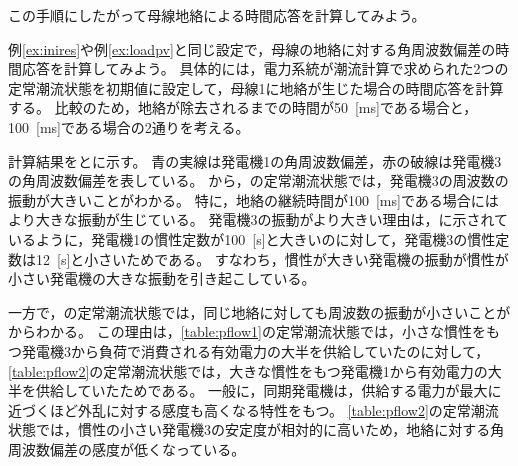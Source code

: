 \documentclass[tombow,dvipdfmx]{corona-a5-1.1}
\begin{document}
この手順にしたがって母線地絡による時間応答を計算してみよう。

\begin{例}[母線地絡に対する電力系統モデルの時間応答]\label{ex:busflt}
例\ref{ex:inires}や例\ref{ex:loadpv}と同じ設定で，母線の地絡に対する角周波数偏差の時間応答を計算してみよう。
具体的には，電力系統が潮流計算で求められた2つの定常潮流状態を初期値に設定して，母線1に地絡が生じた場合の時間応答を計算する。
比較のため，地絡が除去されるまでの時間が50~[ms]である場合と，100~[ms]である場合の2通りを考える。

計算結果をとに示す。
青の実線は発電機1の角周波数偏差，赤の破線は発電機3の角周波数偏差を表している。
から，の定常潮流状態では，発電機3の周波数の振動が大きいことがわかる。
特に，地絡の継続時間が100~[ms]である場合にはより大きな振動が生じている。
発電機3の振動がより大きい理由は，に示されているように，発電機1の慣性定数が100~[s]と大きいのに対して，発電機3の慣性定数は12~[s]と小さいためである。
すなわち，慣性が大きい発電機の振動が慣性が小さい発電機の大きな振動を引き起こしている。

一方で，の定常潮流状態では，同じ地絡に対しても周波数の振動が小さいことがからわかる。
この理由は，\ref{table:pflow1}の定常潮流状態では，小さな慣性をもつ発電機3から負荷で消費される有効電力の大半を供給していたのに対して，\ref{table:pflow2}の定常潮流状態では，大きな慣性をもつ発電機1から有効電力の大半を供給していたためである。
一般に，同期発電機は，供給する電力が最大に近づくほど外乱に対する感度も高くなる特性をもつ。
\ref{table:pflow2}の定常潮流状態では，慣性の小さい発電機3の安定度が相対的に高いため，地絡に対する角周波数偏差の感度が低くなっている。
\end{例}
\end{document}
